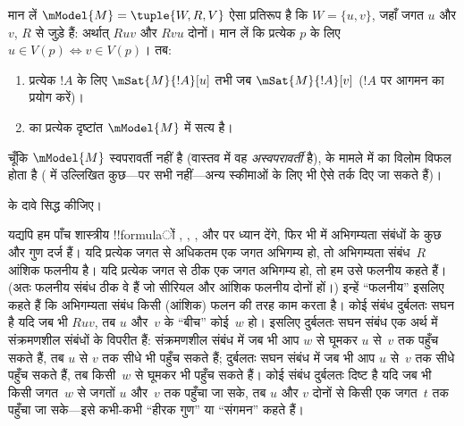 \documentclass[../../../include/open-logic-section]{subfiles}
\begin{document}
\begin{prop}
  मान लें $\mModel{M} = \tuple{W, R, V}$ ऐसा प्रतिरूप है कि
  $W = \{u, v\}$, जहाँ जगत $u$ और $v$, $R$ से जुड़े हैं: अर्थात् $Ruv$ और
  $Rvu$ दोनों। मान लें कि प्रत्येक $p$ के लिए
  $u \in V(p) \Leftrightarrow v \in V(p)$। तब:
  \begin{enumerate}
  \item प्रत्येक $!A$ के लिए $\mSat{M}{!A}[u]$ तभी जब
    $\mSat{M}{!A}[v]$ ($!A$ पर आगमन का प्रयोग करें)।
  \item {} का प्रत्येक दृष्टांत $\mModel{M}$ में सत्य है।
  \end{enumerate}
  चूँकि $\mModel{M}$ स्वपरावर्ती नहीं है (वास्तव में वह
  \emph{अस्वपरावर्ती} है),  के मामले में
   का विलोम विफल होता है
  ( में उल्लिखित कुछ---पर सभी नहीं---अन्य स्कीमाओं
  के लिए भी ऐसे तर्क दिए जा सकते हैं)।
\end{prop}

\begin{prob}
   के दावे सिद्ध कीजिए।
\end{prob}

यद्यपि हम पाँच शास्त्रीय !!{formula}ों , , ,  और
 पर ध्यान देंगे, फिर भी  में अभिगम्यता संबंधों
के कुछ और गुण दर्ज हैं। यदि प्रत्येक जगत से अधिकतम एक जगत अभिगम्य हो, तो
अभिगम्यता संबंध~$R$ आंशिक फलनीय है। यदि प्रत्येक जगत से ठीक एक जगत अभिगम्य
हो, तो हम उसे फलनीय कहते हैं। (अतः फलनीय संबंध ठीक वे हैं जो सीरियल और
आंशिक फलनीय दोनों हों।) इन्हें ``फलनीय'' इसलिए कहते हैं कि अभिगम्यता संबंध
किसी (आंशिक) फलन की तरह काम करता है। कोई संबंध दुर्बलतः सघन है यदि जब भी
$Ruv$, तब $u$ और~$v$ के ``बीच'' कोई~$w$ हो। इसलिए दुर्बलतः सघन संबंध एक
अर्थ में संक्रमणशील संबंधों के विपरीत हैं: संक्रमणशील संबंध में जब भी आप
$w$ से घूमकर $u$ से~$v$ तक पहुँच सकते हैं, तब $u$ से $v$ तक सीधे भी पहुँच
सकते हैं; दुर्बलतः सघन संबंध में जब भी आप $u$ से~$v$ तक सीधे पहुँच सकते
हैं, तब किसी~$w$ से घूमकर भी पहुँच सकते हैं। कोई संबंध दुर्बलतः दिष्ट है
यदि जब भी किसी जगत~$w$ से जगतों $u$ और~$v$ तक पहुँचा जा सके, तब $u$ और
$v$ दोनों से किसी एक जगत~$t$ तक पहुँचा जा सके---इसे कभी-कभी ``हीरक गुण''
या ``संगमन'' कहते हैं।
\end{document}
